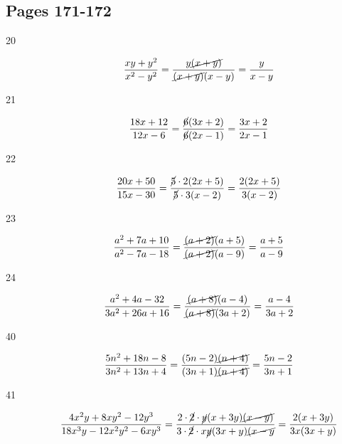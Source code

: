 \documentclass[fleqn,addpoints]{exam}
\begin{document}
\ifprintanswers

\subsection{Pages 171-172}
\begin{description}






\item[20]
\[\frac{xy + y^2}{x^2 - y^2} = \frac{y \cancel{(x + y)}}{\cancel{(x + y)}(x - y)} = \frac{y}{x - y} \]

\item[21]
\[\frac{18x + 12}{12x - 6} = \frac{\cancel{6}(3x + 2)}{ \cancel{6} (2x - 1) } = \frac{3x + 2}{2x - 1} \]

\item[22]
\[\frac{20x + 50}{15x - 30} = \frac{\cancel{5} \cdot 2 (2x + 5) }{\cancel{5} \cdot 3 (x - 2)} = \frac{2(2x + 5)}{3(x - 2)} \]

\item[23]
\[\frac{a^2 + 7a + 10}{a^2 - 7a - 18} = \frac{\cancel{ (a + 2)} (a + 5)}{ \cancel{(a + 2)} (a - 9)} = \frac{a + 5}{a - 9} \]

\item[24]
\[\frac{a^2 + 4a - 32}{3a^2 + 26a + 16} = \frac{\cancel{(a + 8)} (a - 4) }{ \cancel{(a + 8)} (3a + 2)} 
= \frac{a - 4}{3a + 2} \]

\item[40]
\[\frac{5n^2 + 18n - 8}{3n^2 + 13n + 4} = \frac{ (5n - 2)\cancel{(n + 4)} }{ (3n + 1) \cancel{(n + 4)} } 
= \frac{5n - 2}{3n + 1} \]

\item[41]
\[\frac{4x^2y + 8xy^2 - 12y^3}{18x^3y - 12x^2y^2 - 6xy^3} 
= \frac{2 \cdot \cancel{2} \cdot \cancel{y}(x + 3y)\cancel{(x - y)}} {3 \cdot \cancel{2} \cdot x\cancel{y} (3x + y) \cancel{(x - y}} 
= \frac{2(x + 3y)}{3x(3x + y)} \]


\end{description}
\end{document}
